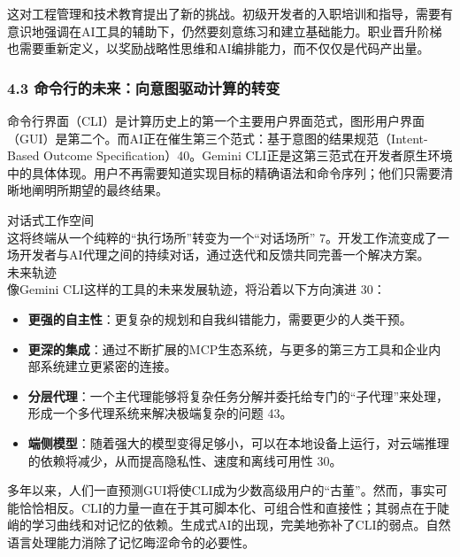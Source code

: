 \documentclass[a4paper,12pt]{article}
\providecommand{\tightlist}{%
  \setlength{\itemsep}{0pt}\setlength{\parskip}{0pt}}
\begin{document}
\begin{multicols}{2}
    这对工程管理和技术教育提出了新的挑战。初级开发者的入职培训和指导，需要有意识地强调在AI工具的辅助下，仍然要刻意练习和建立基础能力。职业晋升阶梯也需要重新定义，以奖励战略性思维和AI编排能力，而不仅仅是代码产出量。

    \subsubsection{\texorpdfstring{\textbf{4.3
    命令行的未来：向意图驱动计算的转变}}{4.3 命令行的未来：向意图驱动计算的转变}}\label{ux547dux4ee4ux884cux7684ux672aux6765ux5411ux610fux56feux9a71ux52a8ux8ba1ux7b97ux7684ux8f6cux53d8}

    命令行界面（CLI）是计算历史上的第一个主要用户界面范式，图形用户界面（GUI）是第二个。而AI正在催生第三个范式：基于意图的结果规范（Intent-Based
    Outcome Specification）40。Gemini
    CLI正是这第三范式在开发者原生环境中的具体体现。用户不再需要知道实现目标的精确语法和命令序列；他们只需要清晰地阐明所期望的最终结果。

    对话式工作空间\\
    这将终端从一个纯粹的``执行场所''转变为一个``对话场所''
    7。开发工作流变成了一场开发者与AI代理之间的持续对话，通过迭代和反馈共同完善一个解决方案。\\
    未来轨迹\\
    像Gemini CLI这样的工具的未来发展轨迹，将沿着以下方向演进 30：

    \begin{itemize}
    \tightlist
    \item
      \textbf{更强的自主性}：更复杂的规划和自我纠错能力，需要更少的人类干预。\\
    \item
      \textbf{更深的集成}：通过不断扩展的MCP生态系统，与更多的第三方工具和企业内部系统建立更紧密的连接。\\
    \item
      \textbf{分层代理}：一个主代理能够将复杂任务分解并委托给专门的``子代理''来处理，形成一个多代理系统来解决极端复杂的问题
      43。\\
    \item
      \textbf{端侧模型}：随着强大的模型变得足够小，可以在本地设备上运行，对云端推理的依赖将减少，从而提高隐私性、速度和离线可用性
      30。
    \end{itemize}

    多年以来，人们一直预测GUI将使CLI成为少数高级用户的``古董''。然而，事实可能恰恰相反。CLI的力量一直在于其可脚本化、可组合性和直接性；其弱点在于陡峭的学习曲线和对记忆的依赖。生成式AI的出现，完美地弥补了CLI的弱点。自然语言处理能力消除了记忆晦涩命令的必要性。


\end{multicols}
\end{document}
